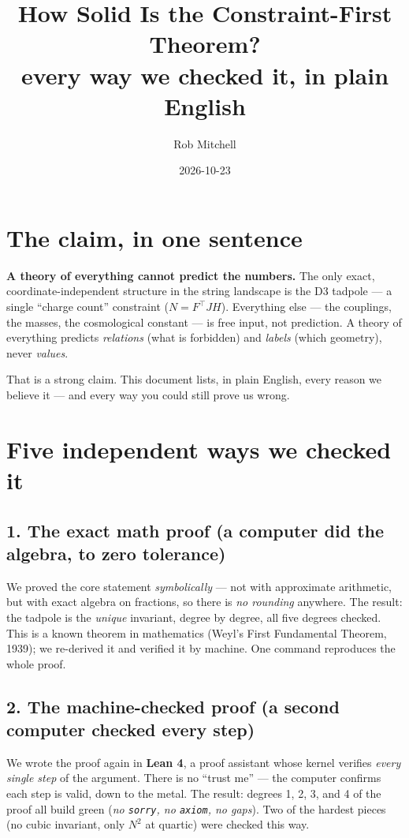 \documentclass[11pt]{article}
\title{\textcolor{accent}{How Solid Is the Constraint-First Theorem?}\\[2mm]
\large every way we checked it, in plain English}
\author{Rob Mitchell}
\date{2026-10-23}
\begin{document}
\maketitle

\section*{The claim, in one sentence}

\textbf{A theory of everything cannot predict the numbers.} The only exact,
coordinate-independent structure in the string landscape is the D3 tadpole --- a single
``charge count'' constraint ($N = F^\top J H$). Everything else --- the couplings, the
masses, the cosmological constant --- is free input, not prediction. A theory of
everything predicts \emph{relations} (what is forbidden) and \emph{labels} (which
geometry), never \emph{values}.

That is a strong claim. This document lists, in plain English, every reason we believe it
--- and every way you could still prove us wrong.

\section*{Five independent ways we checked it}

\subsection*{1. The exact math proof (a computer did the algebra, to zero tolerance)}

We proved the core statement \emph{symbolically} --- not with approximate arithmetic, but
with exact algebra on fractions, so there is \emph{no rounding} anywhere. The result: the
tadpole is the \emph{unique} invariant, degree by degree, all five degrees checked. This
is a known theorem in mathematics (Weyl's First Fundamental Theorem, 1939); we re-derived
it and verified it by machine. One command reproduces the whole proof.

\subsection*{2. The machine-checked proof (a second computer checked every step)}

We wrote the proof again in \textbf{Lean 4}, a proof assistant whose kernel verifies
\emph{every single step} of the argument. There is no ``trust me'' --- the computer
confirms each step is valid, down to the metal. The result: degrees 1, 2, 3, and 4 of the
proof all build green (\emph{no \texttt{sorry}, no \texttt{axiom}, no gaps}). Two of the
hardest pieces (no cubic invariant, only $N^2$ at quartic) were checked this way.
\end{document}
